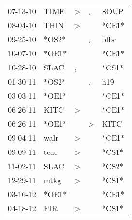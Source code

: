 \begin{supertabular}{p{0.07\textwidth}p{0.06\textwidth}p{0.02\textwidth}p{0.02\textwidth}p{0.06\textwidth}}
          07-13-10\textsuperscript{} &           TIME\textsuperscript{} &     \textgreater &             , &           SOUP\textsuperscript{} \\
          08-04-10\textsuperscript{} &           THIN\textsuperscript{} &     \textgreater &               &                            *CE1* \\
          09-25-10\textsuperscript{} &                            *OS2* &                  &             , &           blbc\textsuperscript{} \\
          10-07-10\textsuperscript{} &                            *OE1* &                  &               &                            *CE1* \\
          10-28-10\textsuperscript{} &           SLAC\textsuperscript{} &                , &               &                            *CS1* \\
          01-30-11\textsuperscript{} &                            *OS2* &                  &             , &            h19\textsuperscript{} \\
          03-03-11\textsuperscript{} &                            *OE1* &                  &               &                            *CE1* \\
          06-26-11\textsuperscript{} &           KITC\textsuperscript{} &     \textgreater &               &                            *CE1* \\
          06-26-11\textsuperscript{} &                            *OE1* &                  &  \textgreater &           KITC\textsuperscript{} \\
          09-04-11\textsuperscript{} &           walr\textsuperscript{} &     \textgreater &               &                            *CE1* \\
          09-09-11\textsuperscript{} &           teac\textsuperscript{} &     \textgreater &               &                            *CS1* \\
          11-02-11\textsuperscript{} &           SLAC\textsuperscript{} &     \textgreater &               &                            *CS2* \\
          12-29-11\textsuperscript{} &           mtkg\textsuperscript{} &     \textgreater &               &                            *CS1* \\
          03-16-12\textsuperscript{} &                            *OE1* &                  &               &                            *CE1* \\
          04-18-12\textsuperscript{} &            FIR\textsuperscript{} &     \textgreater &               &                            *CS1* \\

\end{supertabular}
